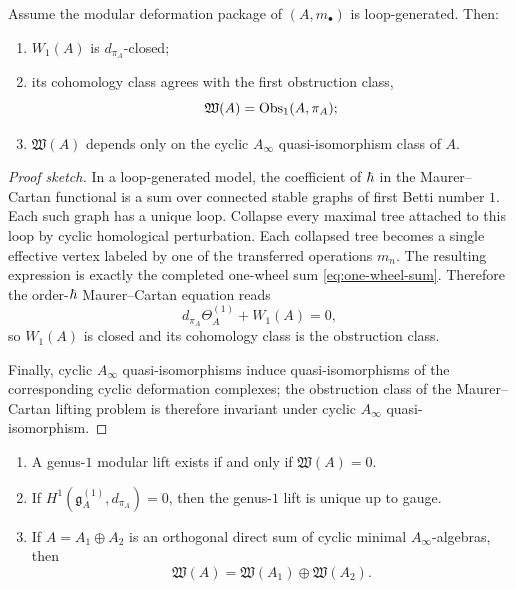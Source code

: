 \begin{theorem}
Assume the modular deformation package of $(A,m_\bullet)$ is loop-generated. Then:
\begin{enumerate}[label=\textup{(\roman*)}]
\item $W_1(A)$ is $d_{\pi_A}$-closed;
\item its cohomology class agrees with the first obstruction class,
\[
\mathfrak W(A)=\operatorname{Obs}_1(A,\pi_A);
\]
\item $\mathfrak W(A)$ depends only on the cyclic $A_\infty$ quasi-isomorphism class of $A$.
\end{enumerate}
\end{theorem}

\begin{proof}[Proof sketch]
In a loop-generated model, the coefficient of $\hbar$ in the Maurer--Cartan functional is a sum
over connected stable graphs of first Betti number $1$. Each such graph has a unique loop.
Collapse every maximal tree attached to this loop by cyclic homological perturbation. Each
collapsed tree becomes a single effective vertex labeled by one of the transferred operations
$m_n$. The resulting expression is exactly the completed one-wheel sum \eqref{eq:one-wheel-sum}.
Therefore the order-$\hbar$ Maurer--Cartan equation reads
\[
d_{\pi_A}\Theta_A^{(1)}+W_1(A)=0,
\]
so $W_1(A)$ is closed and its cohomology class is the obstruction class.

Finally, cyclic $A_\infty$ quasi-isomorphisms induce quasi-isomorphisms of the corresponding
cyclic deformation complexes; the obstruction class of the Maurer--Cartan lifting problem is
therefore invariant under cyclic $A_\infty$ quasi-isomorphism.
\end{proof}

\begin{corollary}
\begin{enumerate}[label=\textup{(\roman*)}]
\item A genus-$1$ modular lift exists if and only if $\mathfrak W(A)=0$.
\item If $H^1(\mathfrak g_A^{(1)},d_{\pi_A})=0$, then the genus-$1$ lift is unique up to
gauge.
\item If $A=A_1\oplus A_2$ is an orthogonal direct sum of cyclic minimal $A_\infty$-algebras,
then
\[
\mathfrak W(A)=\mathfrak W(A_1)\oplus\mathfrak W(A_2).
\]
\end{enumerate}
\end{corollary}


